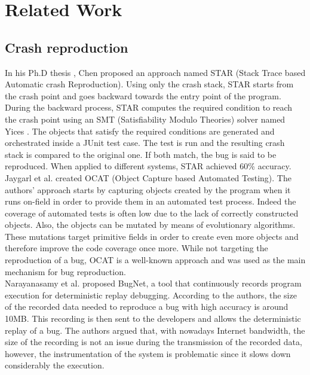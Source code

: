 
\chapter{Related Work\label{chap:relwork}}

\section{Crash reproduction}

In his Ph.D thesis \cite{Chen2013}, Chen proposed an approach named STAR (Stack Trace based Automatic crash Reproduction).
Using only the crash stack, STAR starts from the crash point and goes backward towards the entry point of the program.
During the backward process, STAR computes the required condition to reach the crash point using an SMT (Satisfiability Modulo Theories) solver named Yices \cite{Dutertre2006}.
The objects that satisfy the required conditions are generated and orchestrated inside a JUnit test case. The test is run and the resulting crash stack is compared to the original one. If both match, the bug is said to be reproduced. When applied to different systems, STAR achieved 60\% accuracy. \\

Jaygarl et al. \cite{Jaygarl} created OCAT (Object Capture based Automated Testing).
The authors' approach starts by capturing objects created by the program when it runs on-field in order to provide them in an automated test process. Indeed the coverage of automated tests is often low due to the lack of correctly constructed objects.
Also, the objects can be mutated by means of evolutionary algorithms. These mutations target primitive fields in order to create even more objects and therefore improve the code coverage once more.
While not targeting the reproduction of a bug, OCAT is a well-known approach and was used as the main mechanism for bug reproduction. \\

Narayanasamy et al. \cite{Narayanasamy2005} proposed BugNet, a tool that continuously records program execution for deterministic replay debugging. According to the authors, the size of the recorded data needed to reproduce a bug with high accuracy is around 10MB. This recording is then sent to the developers and allows the deterministic replay of a bug. The authors argued that, with nowadays Internet bandwidth, the size of the recording is not an issue during the transmission of the recorded data, however, the instrumentation of the system is problematic since it slows down considerably the execution.\\

